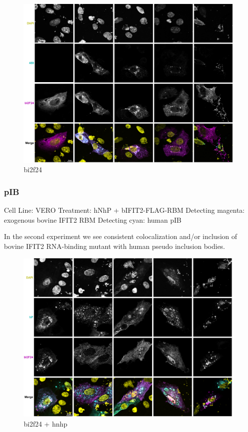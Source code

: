 \begin{figure}
    \centering
    \includegraphics[width=1\linewidth]{09. Chapter 4/Figs/05. IFIT2-RNA binding mutant/02. bi2f24.png}
    \caption[bi2f24]{bi2f24}
    \label{bi2f24}
\end{figure}

\subsubsection{pIB}
Cell Line: VERO
Treatment: hNhP + bIFIT2-FLAG-RBM
Detecting magenta: exogenous bovine IFIT2 RBM
Detecting cyan: human pIB

In the second experiment we see consistent colocalization and/or inclusion of bovine IFIT2 RNA-binding mutant with human pseudo inclusion bodies.

\begin{figure}
    \centering
    \includegraphics[width=0.5\linewidth]{09. Chapter 4/Figs/05. IFIT2-RNA binding mutant/03. bi2f hnhp.png}
    \caption[bi2f24 + hnhp]{bi2f24 + hnhp}
    \label{bi2f24 + hnhp}
\end{figure}

